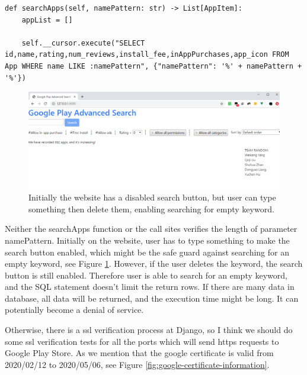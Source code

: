 \documentclass[12pt, a4paper]{article}
\begin{document}
\begin{lstlisting}[frame=tb, caption=DBUtils.AppAccessor.searchApps(), label=lst:searchApps]
def searchApps(self, namePattern: str) -> List[AppItem]:
	appList = []

	self.__cursor.execute("SELECT id,name,rating,num_reviews,install_fee,inAppPurchases,app_icon FROM App WHERE name LIKE :namePattern", {"namePattern": '%' + namePattern + '%'})
\end{lstlisting}

\begin{figure}[ht]
\centering
\includegraphics[width=\textwidth]{website-gray-button.png}
\caption{Initially the website has a disabled search button, but user can type something then delete them, enabling searching for empty keyword.}
\label{fig:website-gray-buton}
\end{figure}

Neither the searchApps function or the call sites verifies the length of parameter namePattern. Initially on the website, user has to type something to make the search button enabled, which might be the safe guard against searching for an empty keyword, see Figure \ref{fig:website-gray-buton}. However, if the user deletes the keyword, the search button is still enabled. Therefore user is able to search for an empty keyword, and the SQL statement doesn't limit the return rows. If there are many data in database, all data will be returned, and the execution time might be long. It can potentially become a denial of service.




Otherwise, there is a ssl verification process at Django, so I think we should do some ssl verification tests for all the ports which will send https requests to Google Play Store. As we mention that the google certificate is valid from 2020/02/12 to 2020/05/06, see Figure \ref{fig:google-certificate-information}. 
\end{document}

